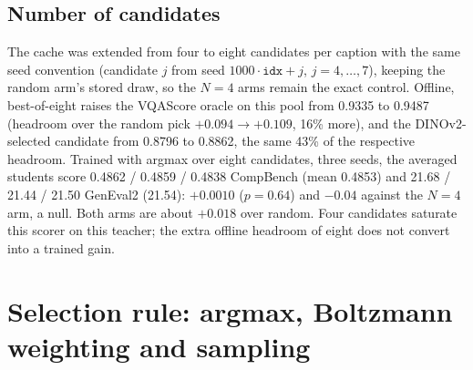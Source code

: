 \documentclass[11pt,a4paper]{article}
\begin{document}
\subsection{Number of candidates}
\label{sec:n8}
The cache was extended from four to eight candidates per caption with the same seed convention (candidate $j$ from seed $1000\cdot\texttt{idx}+j$, $j=4,\dots,7$), keeping the random arm's stored draw, so the $N=4$ arms remain the exact control. Offline, best-of-eight raises the VQAScore oracle on this pool from 0.9335 to 0.9487 (headroom over the random pick $+0.094\to+0.109$, 16\% more), and the DINOv2-selected candidate from 0.8796 to 0.8862, the same 43\% of the respective headroom. Trained with argmax over eight candidates, three seeds, the averaged students score 0.4862 / 0.4859 / 0.4838 CompBench (mean 0.4853) and 21.68 / 21.44 / 21.50 GenEval2 (21.54): $+0.0010$ ($p=0.64$) and $-0.04$ against the $N=4$ arm, a null. Both arms are about $+0.018$ over random. Four candidates saturate this scorer on this teacher; the extra offline headroom of eight does not convert into a trained gain.

\clearpage
\section{Selection rule: argmax, Boltzmann weighting and sampling}
\label{sec:selrule}
\end{document}
